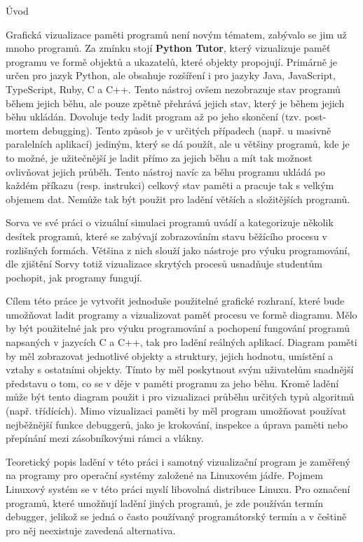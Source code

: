 \documentclass[czech,bachelor,male,python,dept460]{diploma}						%
\newcommand{\parspace}[1][]{
	\ifthenelse{\isempty{#1}}{\vspace{5mm}}{\vspace{#1}}
	\par
}
\begin{document}
\begin{section}{Úvod}
	\parspace Grafická vizualizace paměti programů není novým tématem, zabývalo se jim už mnoho programů. Za zmínku stojí \textbf{Python Tutor}, který vizualizuje
	paměť programu ve formě objektů a ukazatelů, které objekty propojují\cite{GuoSIGCSE2013}.
	Primárně je určen pro jazyk Python, ale obsahuje rozšíření i pro jazyky Java, JavaScript, TypeScript, Ruby, C a C++.
	Tento nástroj ovšem nezobrazuje stav programů během jejich běhu, ale pouze zpětně přehrává jejich stav, který je během jejich běhu ukládán.
	Dovoluje tedy ladit program až po jeho skončení (tzv. post-mortem debugging). Tento způsob je v určitých případech (např. u masivně
	paralelních aplikací) jediným, který se dá použít, ale u většiny programů, kde je to možné, je užitečnější je ladit přímo za jejich běhu a mít
	tak možnost ovlivňovat jejich průběh. Tento nástroj navíc za běhu programu ukládá po každém příkazu (resp. instrukci) celkový stav paměti
	a pracuje tak s velkým objemem dat. Nemůže tak být použit pro ladění větších a složitějších programů.
	
	\parspace Sorva ve své práci o vizuální simulaci programů uvádí a kategorizuje několik desítek programů, které se zabývají zobrazováním stavu běžícího
	procesu v rozlišných formách\cite[140]{sorva2012visual}. Většina z nich slouží jako nástroje pro výuku programování, dle zjištění Sorvy totiž vizualizace
	skrytých procesů usnadňuje studentům pochopit, jak programy fungují. \cite[212]{sorva2012visual}
	
	\parspace Cílem této práce je vytvořit jednoduše použitelné grafické rozhraní, které bude umožňovat ladit programy a vizualizovat paměť procesu
	ve formě diagramu. Mělo by být použitelné jak pro výuku programování a pochopení fungování programů napsaných v jazycích C a C++, tak pro ladění reálných
	aplikací. Diagram paměti by měl zobrazovat jednotlivé objekty a struktury, jejich hodnotu, umístění a vztahy s ostatními objekty.
	Tímto by měl poskytnout svým uživatelům snadnější představu o tom, co se v děje v paměti programu za jeho běhu.
	Kromě ladění může být tento diagram použit i pro vizualizaci průběhu určitých typů algoritmů (např. třídících). Mimo vizualizaci paměti by měl program
	umožňovat používat nejběžnější funkce debuggerů, jako je krokování, inspekce a úprava paměti nebo přepínání mezi zásobníkovými rámci a vlákny.
	
	\parspace Teoretický popis ladění v této práci i samotný vizualizační program je zaměřený na programy pro operační systémy založené na Linuxovém jádře.
	Pojmem Linuxový systém se v této práci myslí libovolná distribuce Linuxu. Pro označení programů, které umožňují ladění jiných programů,
	je zde používán termín debugger, jelikož se jedná o často používaný programátorský termín a v češtině pro něj neexistuje zavedená alternativa.


\end{section}
\end{document}

